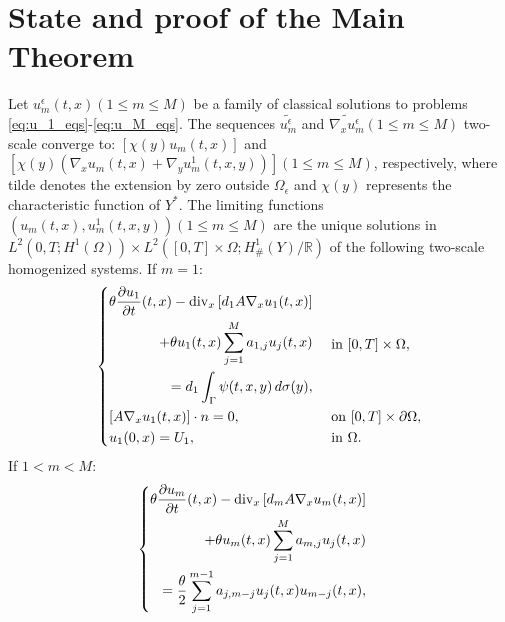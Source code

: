 \section{State and proof of the Main Theorem}
\begin{theorem} Let $u_{m}^{\epsilon}(t, x)(1 \leq m \leq M)$ be a family of classical solutions to problems \eqref{eq:u_1_eqs}-\eqref{eq:u_M_eqs}. The sequences $\widetilde{u_{m}^{\epsilon}}$ and $\widetilde{\nabla_{x} u_{m}^{\epsilon}}(1 \leq m \leq M)$ two-scale converge to: $\left[\chi(y) u_{m}(t, x)\right]$ and $\left[\chi(y)\left(\nabla_{x} u_{m}(t, x)+\nabla_{y} u_{m}^{1}(t, x, y)\right)\right](1 \leq m \leq M)$, respectively, where tilde denotes the extension by zero outside $\Omega_{\epsilon}$ and $\chi(y)$ represents the characteristic function of $Y^{*}$. The limiting functions $\left(u_{m}(t, x), u_{m}^{1}(t, x, y)\right)(1 \leq m \leq M)$ are the unique solutions in $L^{2}\left(0, T ; H^{1}(\Omega)\right) \times L^{2}\left([0, T] \times \Omega ; H_{\#}^{1}(Y) / \mathbb{R}\right)$ of the following two-scale homogenized systems.
If $m=1$:
\begin{equation}
  \begin{dcases}
   \begin{split}
     \theta \frac{\partial u_{1}}{\partial t}(t, x)-\operatorname{div}_{x}\left[d_{1} A \nabla_{x} u_{1}(t, x)\right] \\  +\theta u_{1}(t, x) \sum_{j=1}^{M} a_{1, j} u_{j}(t, x) \\ =d_{1} \int_{\Gamma} \psi(t, x, y) \, d  \sigma(y), 
   \end{split} & \text { in }[0, T]\times\Omega, \\
    {\left[A \nabla_{x} u_{1}(t, x)\right] \cdot n=0}, & \text { on }[0, T]\times\partial\Omega, \\ 
    u_{1}(0, x)=U_{1}, & \text { in }\Omega. \\ 
\end{dcases}
\label{eq 16}
\end{equation}
If $1<m<M$:
\begin{equation}
  \begin{dcases}
    \begin{split}
        \theta \frac{\partial u_{m}}{\partial t}(t, x)-\operatorname{div}_{x}\left[d_{m} A \nabla_{x} u_{m}(t, x)\right] \\ +\theta u_{m}(t, x) \sum_{j=1}^{M} a_{m, j} u_{j}(t, x) & \\ =\frac{\theta}{2} \sum_{j=1}^{m-1} a_{j, m-j} u_{j}(t, x) u_{m-j}(t, x), 

\end{split}
\end{dcases}
\end{equation}
\end{theorem}
